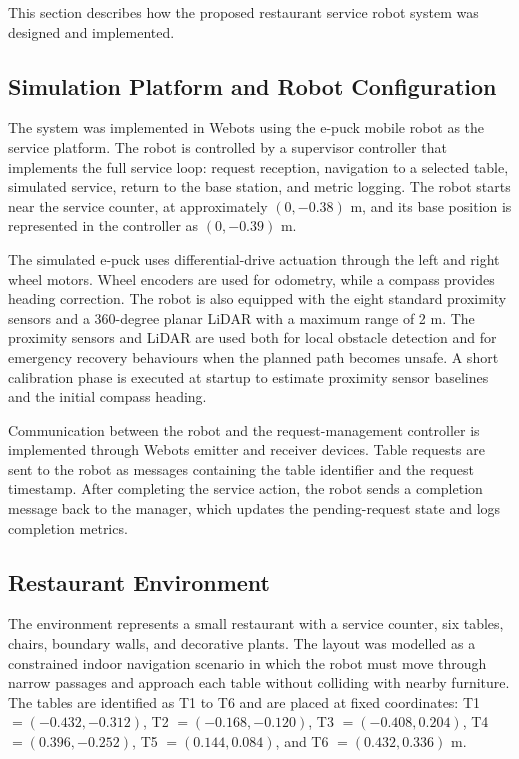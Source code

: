 \documentclass[conference]{IEEEtran}
\begin{document}
This section describes how the proposed restaurant service robot system was designed and implemented.


\subsection{Simulation Platform and Robot Configuration}

The system was implemented in Webots using the e-puck mobile robot as the
service platform. The robot is controlled by a supervisor controller that
implements the full service loop: request reception, navigation to a selected
table, simulated service, return to the base station, and metric logging. The
robot starts near the service counter, at approximately $(0,-0.38)$ m, and its
base position is represented in the controller as $(0,-0.39)$ m.

The simulated e-puck uses differential-drive actuation through the left and
right wheel motors. Wheel encoders are used for odometry, while a compass
provides heading correction. The robot is also equipped with the eight
standard proximity sensors and a 360-degree planar LiDAR with a maximum range
of 2 m. The proximity sensors and LiDAR are used both for local obstacle
detection and for emergency recovery behaviours when the planned path becomes
unsafe. A short calibration phase is executed at startup to estimate proximity
sensor baselines and the initial compass heading.

Communication between the robot and the request-management controller is
implemented through Webots emitter and receiver devices. Table requests are
sent to the robot as messages containing the table identifier and the request
timestamp. After completing the service action, the robot sends a completion
message back to the manager, which updates the pending-request state and logs
completion metrics.


\subsection{Restaurant Environment}

The environment represents a small restaurant with a service counter, six
tables, chairs, boundary walls, and decorative plants. The layout was modelled
as a constrained indoor navigation scenario in which the robot must move
through narrow passages and approach each table without colliding with nearby
furniture. The tables are identified as T1 to T6 and are placed at fixed
coordinates:
T1 $=(-0.432,-0.312)$,
T2 $=(-0.168,-0.120)$,
T3 $=(-0.408,0.204)$,
T4 $=(0.396,-0.252)$,
T5 $=(0.144,0.084)$, and
T6 $=(0.432,0.336)$ m.
\end{document}
